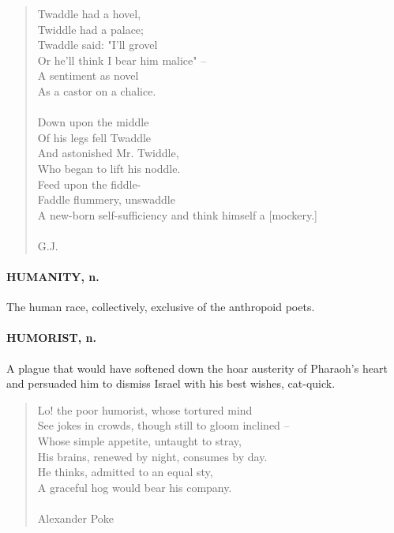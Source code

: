 \documentclass[11pt]{article}
\begin{document}
\begin{quote}       Twaddle had a hovel, \\
          Twiddle had a palace; \\
      Twaddle said:  "I'll grovel \\
          Or he'll think I bear him malice" -- \\
  A sentiment as novel \\
      As a castor on a chalice. \\
 \\
      Down upon the middle \\
          Of his legs fell Twaddle \\
      And astonished Mr. Twiddle, \\
          Who began to lift his noddle. \\
      Feed upon the fiddle- \\
          Faddle flummery, unswaddle \\
  A new-born self-sufficiency and think himself a [mockery.] \\
 \\
G.J. \end{quote}


\paragraph{HUMANITY, n.}  The human race, collectively, exclusive of the
anthropoid poets.

\paragraph{HUMORIST, n.}  A plague that would have softened down the hoar
austerity of Pharaoh's heart and persuaded him to dismiss Israel with
his best wishes, cat-quick.

\begin{quote}   Lo! the poor humorist, whose tortured mind \\
  See jokes in crowds, though still to gloom inclined -- \\
  Whose simple appetite, untaught to stray, \\
  His brains, renewed by night, consumes by day. \\
  He thinks, admitted to an equal sty, \\
  A graceful hog would bear his company. \\
 \\
Alexander Poke \end{quote}
\end{document}
